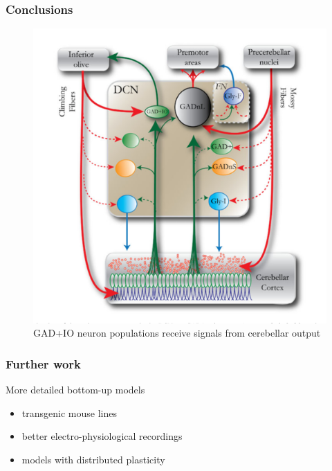 \documentclass[10pt, compress]{beamer}
\begin{document}
\begin{frame}[fragile]
  \frametitle{Conclusions}
  \begin{figure}
    \includegraphics[scale=0.3]{images/uusisaari.png}
    \caption{GAD+IO neuron populations receive signals from cerebellar output \cite{Uusisaari2011}}
  \end{figure}
\end{frame}

\begin{frame}[fragile]
  \frametitle{Further work}
  More detailed bottom-up models
  \begin{itemize}
    \item transgenic mouse lines
    \item better electro-physiological recordings
    \item models with distributed plasticity
  \end{itemize}
\end{frame}


%   
\end{document}
